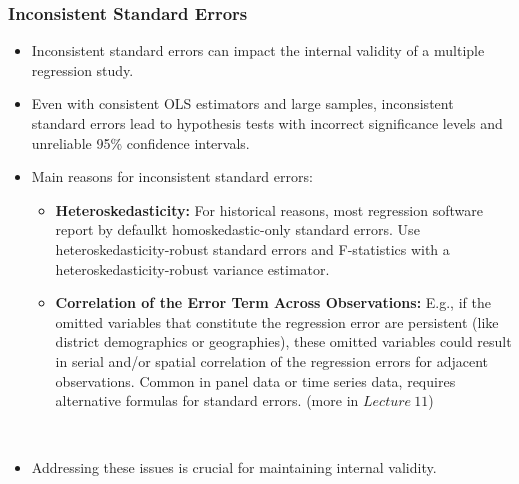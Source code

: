 \documentclass[notes,10pt, aspectratio=169]{beamer}
\begin{document}
\begin{frame}
\frametitle{Inconsistent Standard Errors}

\begin{itemize}
  \item Inconsistent standard errors can impact the internal validity of a multiple regression study.\\[1em]
  \item Even with consistent OLS estimators and large samples, inconsistent standard errors lead to hypothesis tests with incorrect significance levels and unreliable 95\% confidence intervals.\\[1em]
  \item Main reasons for inconsistent standard errors:
    \begin{itemize}\\[.5em]
      \item \textbf{Heteroskedasticity:} For historical reasons, most regression software report by defaulkt homoskedastic-only standard errors. Use heteroskedasticity-robust standard errors and F-statistics with a heteroskedasticity-robust variance estimator.\\[.5em]
      \item \textbf{Correlation of the Error Term Across Observations:} E.g., if the omitted variables that constitute the regression error are persistent (like district demographics or geographies), these omitted variables could result in serial and/or spatial correlation of the regression errors for adjacent observations. Common in panel data or time series data, requires alternative formulas for standard errors. (more in $Lecture~11$)
    \end{itemize}\\[1em]
  \item Addressing these issues is crucial for maintaining internal validity.

\end{itemize}
\end{frame}
\end{document}
